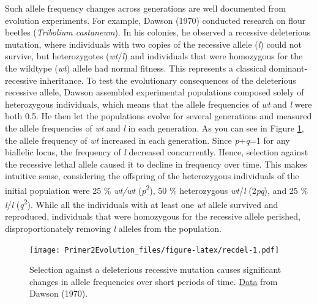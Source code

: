 \documentclass[
]{book}
\begin{document}
Such allele frequency changes across generations are well documented from evolution experiments. For example, Dawson (1970) conducted research on flour beetles (\emph{Tribolium castaneum}). In his colonies, he observed a recessive deleterious mutation, where individuals with two copies of the recessive allele (\emph{l}) could not survive, but heterozygotes (\emph{wt}/\emph{l}) and individuals that were homozygous for the the wildtype (\emph{wt}) allele had normal fitness. This represents a classical dominant-recessive inheritance. To test the evolutionary consequences of the deleterious recessive allele, Dawson assembled experimental populations composed solely of heterozygous individuals, which means that the allele frequencies of \emph{wt} and \emph{l} were both 0.5. He then let the populations evolve for several generations and measured the allele frequencies of \emph{wt} and \emph{l} in each generation. As you can see in Figure \ref{fig:recdel}, the allele frequency of \emph{wt} increased in each generation. Since \emph{p}+\emph{q}=1 for any biallelic locus, the frequency of \emph{l} decreased concurrently. Hence, selection against the recessive lethal allele caused it to decline in frequency over time. This makes intuitive sense, considering the offspring of the heterozygous individuals of the initial population were 25 \% \emph{wt/wt} (\emph{p}\textsuperscript{2}), 50 \% heterozygous \emph{wt}/\emph{l} (2\emph{pq}), and 25 \% \emph{l}/\emph{l} (\emph{q}\textsuperscript{2}). While all the individuals with at least one \emph{wt} allele survived and reproduced, individuals that were homozygous for the recessive allele perished, disproportionately removing \emph{l} alleles from the population.

\begin{figure}
\centering
\texttt{[image: Primer2Evolution\_files/figure-latex/recdel-1.pdf]}
\caption{\label{fig:recdel}Selection against a deleterious recessive mutation causes significant changes in allele frequencies over short periods of time. \href{data/5_lethal_recessive.csv}{Data} from Dawson (1970).}
\end{figure}
\end{document}
